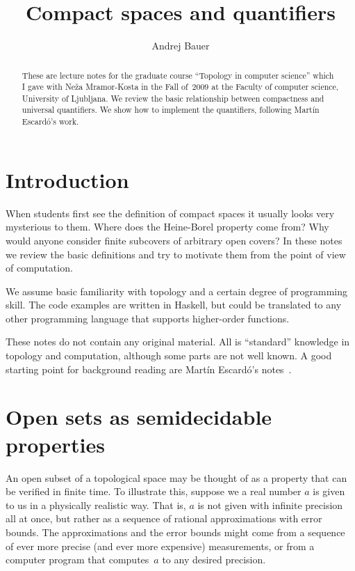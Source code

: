 \documentclass[a4paper,11pt]{article}
\begin{document}
\title{Compact spaces and quantifiers}
\author{Andrej Bauer}

\maketitle

\begin{abstract}
  These are lecture notes for the graduate course ``Topology in
  computer science'' which I gave with Neža Mramor-Kosta in the Fall
  of~2009 at the Faculty of computer science, University of Ljubljana.
  We review the basic relationship between compactness and universal
  quantifiers. We show how to implement the quantifiers, following
  Martín Escardó's work.
\end{abstract}

\section{Introduction}
\label{sec:introduction}

When students first see the definition of compact spaces it usually
looks very mysterious to them. Where does the Heine-Borel property
come from? Why would anyone consider finite subcovers of arbitrary
open covers? In these notes we review the basic definitions and try to
motivate them from the point of view of computation.

We assume basic familiarity with topology and a certain degree of
programming skill. The code examples are written in Haskell, but could
be translated to any other programming language that supports
higher-order functions.

These notes do not contain any original material. All is ``standard''
knowledge in topology and computation, although some parts are not
well known. A good starting point for background reading are Martín
Escardó's notes~\cite{escardo}.

\section{Open sets as semidecidable properties}
\label{sec:opens-semidecidable}

An open subset of a topological space may be thought of as a property
that can be verified in finite time. To illustrate this, suppose we a
real number $a$ is given to us in a physically realistic way. That is,
$a$ is not given with infinite precision all at once, but rather as a
sequence of rational approximations with error bounds. The
approximations and the error bounds might come from a sequence of ever
more precise (and ever more expensive) measurements, or from a
computer program that computes~$a$ to any desired precision.
\end{document}
